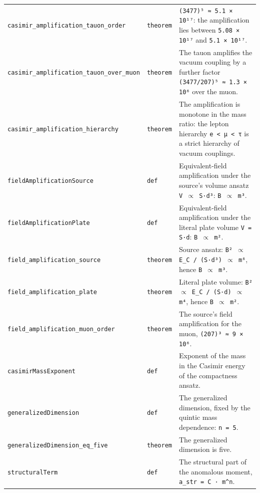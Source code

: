 \documentclass[11pt,a4paper]{article}
\begin{document}
\begin{center}
\begin{longtable}{@{}p{}p{}p{}@{}}
\texttt{casimir\_\allowbreak{}amplification\_\allowbreak{}tauon\_\allowbreak{}order} & \texttt{theorem} & \small \texttt{(3477)⁵ ≈ 5.1 × 10¹⁷}: the amplification lies between \texttt{5.08 × 10¹⁷} and \texttt{5.1 × 10¹⁷}. \\
\texttt{casimir\_\allowbreak{}amplification\_\allowbreak{}tauon\_\allowbreak{}over\_\allowbreak{}muon} & \texttt{theorem} & \small The tauon amplifies the vacuum coupling by a further factor \texttt{(3477/207)⁵ ≈ 1.3 × 10⁶} over the muon. \\
\texttt{casimir\_\allowbreak{}amplification\_\allowbreak{}hierarchy} & \texttt{theorem} & \small The amplification is monotone in the mass ratio: the lepton hierarchy \texttt{e \textless{} μ \textless{} τ} is a strict hierarchy of vacuum couplings. \\
\texttt{fieldAmplificationSource} & \texttt{def} & \small Equivalent-field amplification under the source's volume ansatz \texttt{V $\propto$ S·d³}: \texttt{B $\propto$ m³}. \\
\texttt{fieldAmplificationPlate} & \texttt{def} & \small Equivalent-field amplification under the literal plate volume \texttt{V = S·d}: \texttt{B $\propto$ m²}. \\
\texttt{field\_\allowbreak{}amplification\_\allowbreak{}source} & \texttt{theorem} & \small Source ansatz: \texttt{B² $\propto$ E\_\allowbreak{}C / (S·d³) $\propto$ m⁶}, hence \texttt{B $\propto$ m³}. \\
\texttt{field\_\allowbreak{}amplification\_\allowbreak{}plate} & \texttt{theorem} & \small Literal plate volume: \texttt{B² $\propto$ E\_\allowbreak{}C / (S·d) $\propto$ m⁴}, hence \texttt{B $\propto$ m²}. \\
\texttt{field\_\allowbreak{}amplification\_\allowbreak{}muon\_\allowbreak{}order} & \texttt{theorem} & \small The source's field amplification for the muon, \texttt{(207)³ ≈ 9 × 10⁶}. \\
\texttt{casimirMassExponent} & \texttt{def} & \small Exponent of the mass in the Casimir energy of the compactness ansatz. \\
\texttt{generalizedDimension} & \texttt{def} & \small The generalized dimension, fixed by the quintic mass dependence: \texttt{n = 5}. \\
\texttt{generalizedDimension\_\allowbreak{}eq\_\allowbreak{}five} & \texttt{theorem} & \small The generalized dimension is five. \\
\texttt{structuralTerm} & \texttt{def} & \small The structural part of the anomalous moment, \texttt{a\_\allowbreak{}str = C · m\textasciicircum{}n}. \\

\end{longtable}
\end{center}
\end{document}
